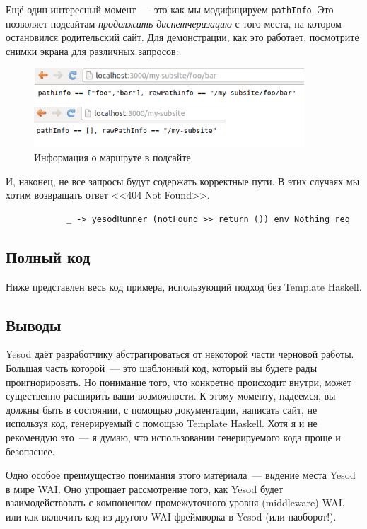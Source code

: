 Ещё один интересный момент~--- это как мы модифицируем \lstinline'pathInfo'.
Это позволяет подсайтам \emph{продолжить диспетчеризацию} с того места, на
котором остановился родительский сайт. Для демонстрации, как это работает,
посмотрите снимки экрана для различных запросов:
\begin{figure}[h!]
  \centering
  \includegraphics[width=0.9\textwidth]{understanding-request/subsite-path-info.png}
  \caption{Информация о маршруте в подсайте}
\end{figure}

И, наконец, не все запросы будут содержать корректные пути. В этих случаях мы
хотим возвращать ответ <<404 Not Found>>.
\begin{lstlisting}
            _ -> yesodRunner (notFound >> return ()) env Nothing req
\end{lstlisting}
            
\subsection{Полный код}
Ниже представлен весь код примера, использующий подход без Template Haskell.


\subsection{Выводы}
Yesod даёт разработчику абстрагироваться от некоторой части черновой работы.
Большая часть которой~--- это шаблонный код, который вы будете рады
проигнорировать. Но понимание того, что конкретно происходит внутри, может
существенно расширить ваши возможности. К этому моменту, надеемся, вы должны
быть в состоянии, с помощью документации, написать сайт, не используя код,
генерируемый с помощью Template Haskell. Хотя я и не рекомендую это~--- я
думаю, что использовании генерируемого кода проще и безопаснее.

Одно особое преимущество понимания этого материала~--- в\emph{и}дение места
Yesod в мире WAI. Оно упрощает рассмотрение того, как Yesod будет
взаимодействовать с компонентом промежуточного уровня (middleware) WAI, или как
включить код из другого WAI фреймворка в Yesod (или наоборот!).
